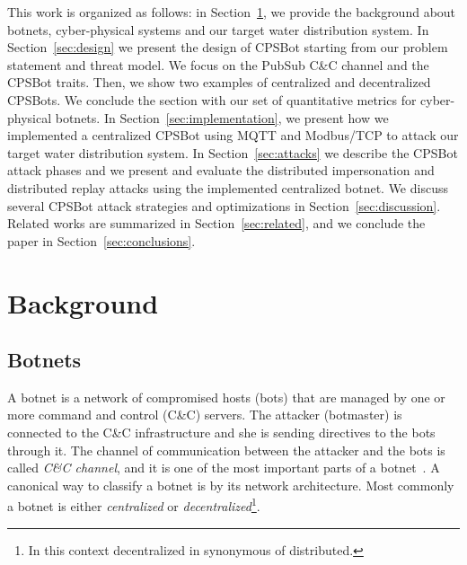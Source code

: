 \documentclass[sigconf]{acmart}
\makeatletter
\newcommand{\Botnet}{CPSBot\@\xspace}
\newcommand{\Botnets}{CPSBots\@\xspace}
\newcommand{\CC}{C\&C\@\xspace}
\makeatother
\begin{document}
This work is organized as follows: in Section~\ref{sec:background}, we
provide the background about botnets, cyber-physical systems and our
target water distribution system. In Section~\ref{sec:design} we present the design
of \Botnet starting from our problem statement and threat model.
We focus on the PubSub \CC channel and the \Botnet traits. Then, we show two examples
of centralized and decentralized \Botnets . We conclude the
section with our set of quantitative metrics for cyber-physical botnets.
In Section~\ref{sec:implementation}, we present how we
implemented a centralized \Botnet using MQTT and Modbus/TCP to attack our
target water distribution system.
In Section~\ref{sec:attacks} we describe the \Botnet attack phases and we
present and evaluate the distributed impersonation and
distributed replay attacks using the implemented centralized botnet.
We discuss several \Botnet attack strategies and optimizations
in Section~\ref{sec:discussion}. Related works are summarized in
Section~\ref{sec:related}, and we conclude the paper in
Section~\ref{sec:conclusions}.


\section{Background}
\label{sec:background}

\subsection{Botnets}
\label{sec:botnets}

A botnet is a network of compromised hosts (bots) that are managed by one
or more command and control (\CC) servers. The attacker (botmaster) is
connected to the \CC infrastructure and she is sending directives to the bots
through it. The channel of communication between the attacker and the bots
is called \emph{\CC channel}, and it is one of the most important parts of a
botnet~\cite{silva2013botnets}. A canonical way to classify a botnet is by its
network architecture. Most commonly a botnet is either \emph{centralized} or
\emph{decentralized}\footnote{In this context decentralized in synonymous of
distributed.}.
\end{document}
